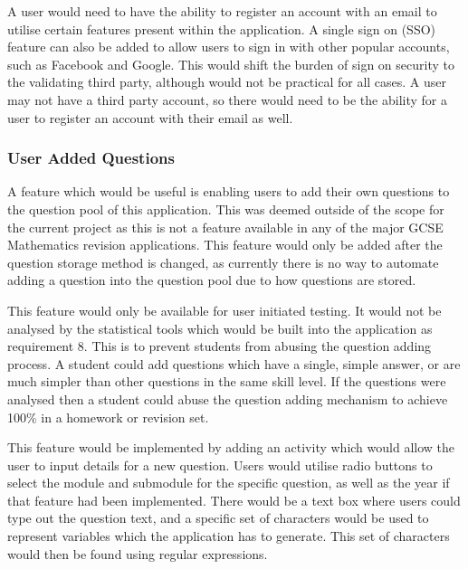 \documentclass{article}
\begin{document}
A user would need to have the ability to register an account with an email to utilise certain features present within the application. A single sign on (SSO) feature can also be added to allow users to sign in with other popular accounts, such as Facebook and Google. This would shift the burden of sign on security to the validating third party, although would not be practical for all cases. A user may not have a third party account, so there would need to be the ability for a user to register an account with their email as well. \par

\subsubsection{User Added Questions}

A feature which would be useful is enabling users to add their own questions to the question pool of this application. This was deemed outside of the scope for the current project as this is not a feature available in any of the major GCSE Mathematics revision applications. This feature would only be added after the question storage method is changed, as currently there is no way to automate adding a question into the question pool due to how questions are stored. \par

This feature would only be available for user initiated testing. It would not be analysed by the statistical tools which would be built into the application as requirement 8. This is to prevent students from abusing the question adding process. A student could add questions which have a single, simple answer, or are much simpler than other questions in the same skill level. If the questions were analysed then a student could abuse the question adding mechanism to achieve 100\% in a homework or revision set. \par

This feature would be implemented by adding an activity which would allow the user to input details for a new question. Users would utilise radio buttons to select the module and submodule for the specific question, as well as the year if that feature had been implemented. There would be a text box where users could type out the question text, and a specific set of characters would be used to represent variables which the application has to generate. This set of characters would then be found using regular expressions. \par
\end{document}

